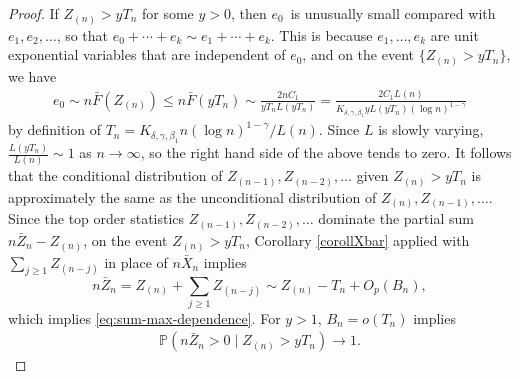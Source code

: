 \documentclass[11pt]{article}
\theoremstyle{definition}
\def\Prob{{\mathbb P}}
\def\Zmax{Z_{(n)}}
\begin{document}
\begin{proof}
	
	If $\Zmax > yT_n$ for some $y > 0$, then $e_0$~is unusually small compared with $e_1, e_2,\ldots$, so that $e_0 + \cdots + e_k \sim e_1 + \cdots + e_k$. This is because $e_1,\dots,e_k$ are unit exponential variables that are independent of $e_0$, and on the event $\{Z_{(n)}>yT_n\}$, we have
    \begin{align*}
        e_0 \sim n\bar{F}(Z_{(n)}) \leq n\bar{F}(yT_n) \sim \frac{2nC_1}{yT_n L(yT_n)} = \frac{2C_1 L(n)}{K_{\delta,\gamma,\beta_1} yL(yT_n)(\log n)^{1-\gamma}}
    \end{align*}
    by definition of $T_n=K_{\delta,\gamma,\beta_1} n (\log n)^{1-\gamma}/L(n)$. Since $L$ is slowly varying, $\frac{L(yT_n)}{L(n)} \sim 1$ as $n\to\infty$, so the right hand side of the above tends to zero.
    It follows that the conditional distribution of $Z_{(n-1)}, Z_{(n-2)},\ldots$ given $\Zmax > y T_n$ is approximately the same
	as the unconditional distribution of $\Zmax, Z_{(n-1)},\dots$.
	Since the top order statistics $Z_{(n-1)}, Z_{(n-2)},\ldots$ dominate the partial sum $n \bar Z_n - \Zmax$, on the event $\Zmax > y T_n$, Corollary \ref{corollXbar} applied with $\sum_{j \ge1} Z_{(n-j)}$ in place of $n \bar X_n$ implies
	\begin{equation}\label{eq16}
	n \bar Z_n = \Zmax + \sum_{j \ge1} Z_{(n-j)} \sim \Zmax - T_n + O_p(B_n),
	\end{equation}
	which implies \eqref{eq:sum-max-dependence}. For $y>1$, $B_n = o(T_n)$ implies
	\begin{align*}
	\Prob(n\bar{Z}_n > 0 \mid Z_{(n)}>yT_n) \to 1.
	\end{align*}
\end{proof}
\end{document}
